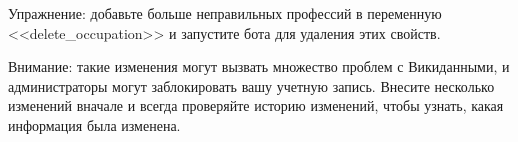 Упражнение: добавьте больше неправильных профессий в переменную <<delete\_occupation>> и запустите бота для удаления этих свойств.

Внимание: такие изменения могут вызвать множество проблем с Викиданными, и администраторы могут заблокировать вашу учетную запись. Внесите несколько изменений вначале и всегда проверяйте историю изменений, чтобы узнать, какая информация была изменена.